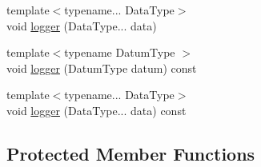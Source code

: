 \begin{DoxyCompactItemize}
\item 
{\footnotesize template$<$typename... Data\+Type$>$ }\\void \mbox{\hyperlink{classbfl_1_1Logger_aca2086c9256e5c404872b91f7f25b97d}{logger}} (Data\+Type... data)
\item 
{\footnotesize template$<$typename Datum\+Type $>$ }\\void \mbox{\hyperlink{classbfl_1_1Logger_a50b1c109730fa98f66e66f420f0158fe}{logger}} (Datum\+Type datum) const
\item 
{\footnotesize template$<$typename... Data\+Type$>$ }\\void \mbox{\hyperlink{classbfl_1_1Logger_a0f0cf7ce956546d94dfb1feb7cebf171}{logger}} (Data\+Type... data) const
\end{DoxyCompactItemize}
\subsection*{Protected Member Functions}
